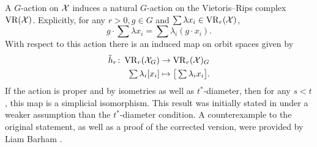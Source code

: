 A \(G\)-action on $\mathcal{X}$ induces a natural \(G\)-action on the Vietoris--Rips complex $\operatorname{VR}(\mathcal{X})$.
Explicitly, for any \(r > 0, g\in G\) and $\sum \lambda x_i \in \operatorname{VR}_r(\mathcal{X})$,
\[
g \cdot \sum \lambda x_i = \sum \lambda_i (g\cdot x_i).
\]
With respect to this action there is an induced map on orbit spaces given by
\begin{align*}
	\tilde h_r \colon \operatorname{VR}_r(\mathcal{X}_G) &\to \operatorname{VR}_r(\mathcal{X})_G \\
	\textstyle\sum\lambda_i [x_i] &\mapsto \textstyle \big[\sum\lambda_i x_i\big].
\end{align*}
If the action is proper and by isometries as well as \(t^*\)-diameter, then for any \(s < t\), this map is a simplicial isomorphism.
This result was initially stated in \cite[Prop.~3.5]{adams2022metric} under a weaker assumption than the \(t^*\)-diameter condition.
A counterexample to the original statement, as well as a proof of the corrected version, were provided by Liam Barham \cite{bibid}.



%

